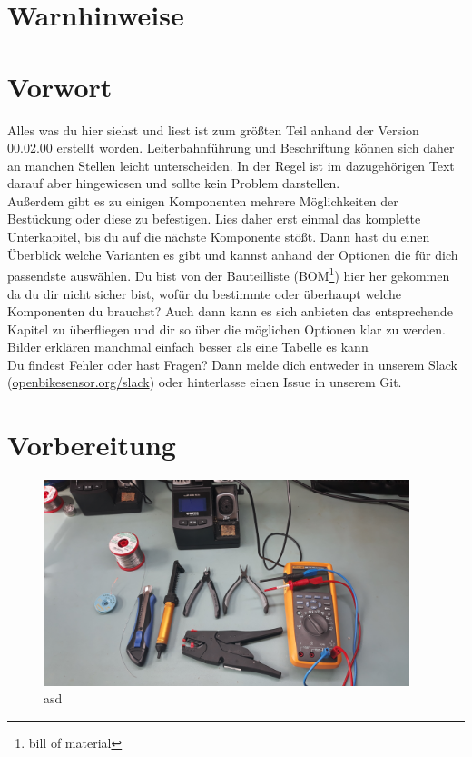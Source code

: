 \documentclass[12pt, a4paper]{article}		%
\begin{document}
\section{Warnhinweise}


\section{Vorwort}

Alles was du hier siehst und liest ist zum größten Teil anhand der Version 00.02.00 erstellt worden. Leiterbahnführung und Beschriftung können sich daher an manchen Stellen leicht unterscheiden. In der Regel ist im dazugehörigen Text darauf aber hingewiesen und sollte kein Problem darstellen.\\

Außerdem gibt es zu einigen Komponenten mehrere Möglichkeiten der Bestückung oder diese zu befestigen. Lies daher erst einmal das komplette Unterkapitel, bis du auf die nächste Komponente stößt. Dann hast du einen Überblick welche Varianten es gibt und kannst anhand der Optionen die für dich passendste auswählen. Du bist von der Bauteilliste (BOM\footnote{bill of material}) hier her gekommen da du dir nicht sicher bist, wofür du bestimmte oder überhaupt welche Komponenten du brauchst? Auch dann kann es sich anbieten das entsprechende Kapitel zu überfliegen und dir so über die möglichen Optionen klar zu werden. Bilder erklären manchmal einfach besser als eine Tabelle es kann \\
Du findest Fehler oder hast Fragen? Dann melde dich entweder in unserem Slack (\href{openbikesensor.org/slack}{openbikesensor.org/slack}) oder hinterlasse einen Issue in unserem Git. 



\section{Vorbereitung}

\begin{figure}[H]
	\centering
		\includegraphics[width=0.95\textwidth]{Grafiken/20200726_121811.jpg}
	\caption{asd}
	\label{fig:20200726_121811}
\end{figure}
\end{document}
